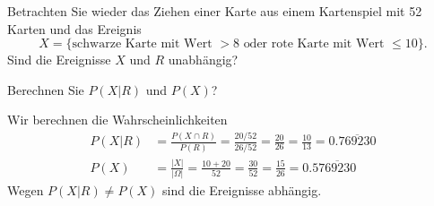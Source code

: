 Betrachten Sie wieder das Ziehen einer Karte aus einem Kartenspiel
mit 52 Karten und das Ereignis
\[
X
=
\{
\text{schwarze Karte mit Wert $>8$ oder rote Karte mit Wert $\le 10$}
\}.
\]
Sind die Ereignisse $X$ und $R$ unabhängig?

\begin{hinweis}
Berechnen Sie $P(X|R)$ und $P(X)$?
\end{hinweis}

\begin{loesung}
Wir berechnen die Wahrscheinlichkeiten
\begin{align*}
P(X|R)
&=
\frac{P(X\cap R)}{P(R)}
=
\frac{20/52}{26/52}
=
\frac{20}{26}
=
\frac{10}{13}
=
0.\overline{769230}
\\
P(X)
&=
\frac{|X|}{|\Omega|}
=
\frac{10+20}{52}
=
\frac{30}{52}
=
\frac{15}{26}
=
0.5\overline{769230}
\end{align*}
Wegen $P(X|R)\ne P(X)$ sind die Ereignisse abhängig.
\end{loesung}


